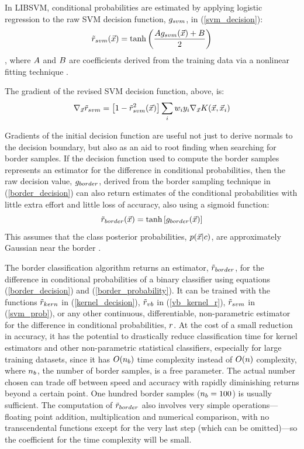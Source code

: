 In LIBSVM, conditional probabilities are estimated by applying
logistic regression \citep{Michie_etal1994} to
the raw SVM decision function, $g_{svm}$, in (\ref{svm_decision}):
\begin{equation}
	\tilde r_{svm}(\vec {x}) = \tanh \left (\frac{A g_{svm}(\vec {x})+ B}{2} \right )
	\label{svm_prob}
\end{equation}
\citep{Chang_Lin2011},
where $A$ and $B$ are coefficients derived from
the training data via a nonlinear fitting technique \citep{Platt1999,Lin_etal2007}.

The gradient of the revised SVM decision function, above, is:
\begin{equation*}
	\nabla_{\vec {x}} {\tilde r_{svm}} = \left [1 - \tilde r_{svm}^2(\vec {x}) \right ] \sum_i w_i y_i \nabla_{\vec {x}} K(\vec {x}, \vec {x}_i)
\end{equation*}

Gradients of the initial decision function are useful not just to derive normals to
the decision boundary, but also as an aid to root finding when searching for
border samples. If the decision function used to compute the border samples
represents an estimator for the
difference in conditional probabilities, then the raw decision value,
$g_{border}$,
derived from the border sampling technique in (\ref{border_decision})
can also return estimates of the conditional probabilities with little
extra effort and little loss of accuracy, also using a sigmoid function:
\begin{equation}
	\tilde r_{border}(\vec {x}) = \tanh \left [g_{border} (\vec {x}) \right ]
	\label{border_probability}
\end{equation}
This assumes that the class posterior probabilities,
$p(\vec {x} | c)$, are approximately Gaussian near the border
\citep{Mills2011}.

The border classification algorithm returns an estimator,
$\tilde r_{border}$, for the difference in conditional probabilities of
a binary classifier using
equations (\ref{border_decision}) and (\ref{border_probability}).
It can be trained with the functions $\tilde r_{kern}$ in (\ref{kernel_decision}),
$\tilde r_{vb}$ in (\ref{vb_kernel_r}), $\tilde r_{svm}$ in (\ref{svm_prob}),
or any other 
continuous, differentiable, non-parametric estimator for the difference
in conditional probabilities, $r$.
At the cost of a small reduction in accuracy,
it has the potential to drastically reduce classification time for kernel
estimators and other non-parametric statistical classifiers,
especially for large training datasets,
since it has $O(n_b)$ time complexity instead of $O(n)$
complexity, where $n_b$, the number of border samples, is a free parameter.
The actual number chosen
can trade off between speed and accuracy with rapidly diminishing returns
beyond a certain point. 
One hundred border samples ($n_b=100$) is usually sufficient.
The computation of $\tilde r_{border}$ also involves very simple operations---
floating point addition, multiplication and numerical comparison, with no
transcendental functions except for the very last step (which can be omitted)---so the coefficient for the time complexity will be small.


